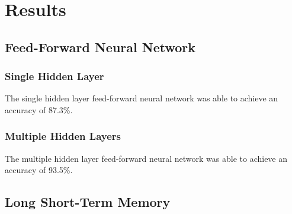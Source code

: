 \section{Results}
\label{sec:results}

\subsection{Feed-Forward Neural Network}

\subsubsection{Single Hidden Layer} The single hidden layer
feed-forward neural network was able to achieve an accuracy of 87.3\%.

\subsubsection{Multiple Hidden Layers} The multiple hidden layer
feed-forward neural network was able to achieve an accuracy of 93.5\%.

\subsection{Long Short-Term Memory}
